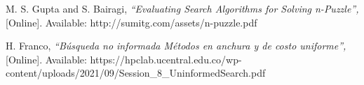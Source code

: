 \documentclass[journal]{IEEEtran}
\begin{document}
\begin{thebibliography}{1}
  

  M. S. Gupta and S. Bairagi, {\it{“Evaluating Search Algorithms for Solving n-Puzzle”,}} [Online]. Available: http://sumitg.com/assets/n-puzzle.pdf

  H. Franco, {\it{“Búsqueda no informada Métodos en anchura y de costo uniforme”,}} [Online]. Available: https://hpclab.ucentral.edu.co/wp-content/uploads/2021/09/Session\_8\_UninformedSearch.pdf

\end{thebibliography}
\end{document}
